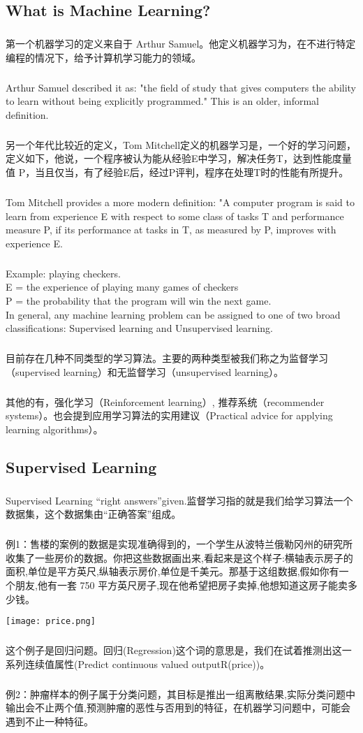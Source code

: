 \documentclass{article}
\begin{document}
\begin{CJK}{UTF8}{gbsn}
\subsection{What is Machine Learning?}
\subparagraph*{}
第一个机器学习的定义来自于 Arthur Samuel。他定义机器学习为，在不进行特定编程的情况下，给予计算机学习能力的领域。
\subparagraph*{}
 Arthur Samuel described it as: "the field of study that gives computers the ability to learn without being explicitly programmed." This is an older, informal definition.
\subparagraph*{}
另一个年代比较近的定义，Tom Mitchell定义的机器学习是，一个好的学习问题，定义如下，他说，一个程序被认为能从经验E中学习，解决任务T，达到性能度量值 P，当且仅当，有了经验E后，经过P评判，程序在处理T时的性能有所提升。
\subparagraph*{}
Tom Mitchell provides a more modern definition: "A computer program is said to learn from experience E with respect to some class of tasks T and performance measure P, if its performance at tasks in T, as measured by P, improves with experience E.
\subparagraph*{}
Example: playing checkers.\\
E = the experience of playing many games of checkers\\
P = the probability that the program will win the next game.\\
In general, any machine learning problem can be assigned to one of two broad classifications:
Supervised learning and Unsupervised learning.\\
\subparagraph*{}
目前存在几种不同类型的学习算法。主要的两种类型被我们称之为监督学习（supervised learning）和无监督学习（unsupervised learning）。
\subparagraph*{}
其他的有，强化学习（Reinforcement learning）, 推荐系统（recommender systems）。也会提到应用学习算法的实用建议（Practical advice for applying learning algorithms）。
\subsection{Supervised Learning}
\subparagraph*{}
Supervised Learning ``right answers''given.监督学习指的就是我们给学习算法一个数据集，这个数据集由“正确答案”组成。
\subparagraph*{}
例1：售楼的案例的数据是实现准确得到的，一个学生从波特兰俄勒冈州的研究所收集了一些房价的数据。你把这些数据画出来,看起来是这个样子:横轴表示房子的面积,单位是平方英尺,纵轴表示房价,单位是千美元。那基于这组数据,假如你有一个朋友,他有一套 750 平方英尺房子,现在他希望把房子卖掉,他想知道这房子能卖多少钱。

\texttt{[image: price.png]}
\subparagraph*{}
这个例子是回归问题。回归(Regression)这个词的意思是，我们在试着推测出这一系列连续值属性(Predict continuous valued outputR(price))。
\subparagraph*{}
例2：肿瘤样本的例子属于分类问题，其目标是推出一组离散结果,实际分类问题中输出会不止两个值,预测肿瘤的恶性与否用到的特征，在机器学习问题中，可能会遇到不止一种特征。


\end{CJK}
\end{document}
